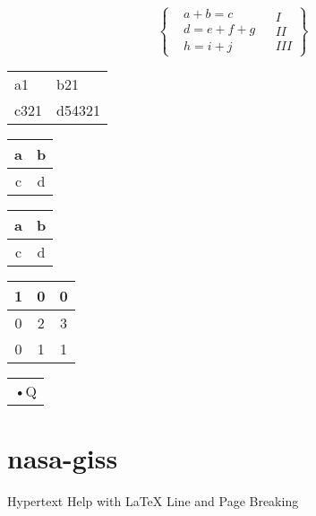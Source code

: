\documentclass[a4paper,11pt]{book} %
\begin{document}
	\[
		\left\{ %
			\begin{aligned}
				&a+b=c\\
				&d=e+f+g\\
				&h=i+j
			\end{aligned} %
			\begin{aligned}
				&I \\
				&II\\
				&III
			\end{aligned}
		\right\}%
	\]
	
	\begin{center}
	\end{center}


	\begin{tabular}{ll|}
		\hline
		\vline a1 &  \vline b21 \\
		c321 & d54321 \\
	\end{tabular}
	\begin{tabular}{|c|c|}
		\hline
		a & b \\
		\hline
		c & d \\
		\hline
	\end{tabular}	
	\begin{center}
		\begin{tabular}{|c|c|}
			\hline
			a & b \\ \hline
			c & d \\
			\hline
		\end{tabular}
	\end{center}

    \begin{tabular}{|c|c|c|}
      \hline
      1 & 0 & 0 \\ \hline
      0 & 2 & 3 \\ \hline
      0 & 1 & 1 \\
      \hline
    \end{tabular}
	
	\begin{tabular}{|r|}
	•Q
	\end{tabular}

\section{nasa-giss}
Hypertext Help with LaTeX
Line and Page Breaking
\end{document}
